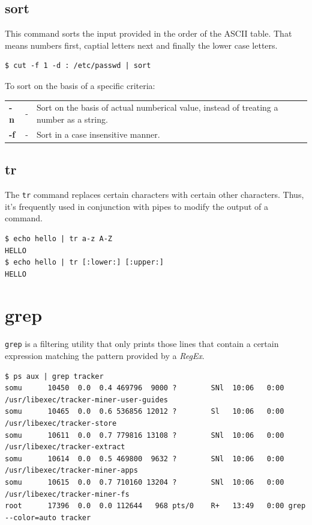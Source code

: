 \subsection{sort}
This command sorts the input provided in the order of the ASCII table. That means numbers first, captial letters next and finally the lower case letters. 

\begin{verbatim}
$ cut -f 1 -d : /etc/passwd | sort
\end{verbatim}

\noindent
To sort on the basis of a specific criteria:

\begin{tabular}{lcp{}}
	\textbf{-n} &- &Sort on the basis of actual numberical value, instead of treating a number as a string. \\
	\textbf{-f} &- &Sort in a case insensitive manner. \\
\end{tabular}

\subsection{tr}
The \verb|tr| command replaces certain characters with certain other characters. Thus, it's frequently used in conjunction with pipes to modify the output of a command. 

\begin{verbatim}
$ echo hello | tr a-z A-Z
HELLO
$ echo hello | tr [:lower:] [:upper:]
HELLO
\end{verbatim}

\section{grep}
\verb|grep| is a filtering utility that only prints those lines that contain a certain expression matching the pattern provided by a \textit{RegEx}.

\begin{verbatim}
$ ps aux | grep tracker
somu      10450  0.0  0.4 469796  9000 ?        SNl  10:06   0:00 /usr/libexec/tracker-miner-user-guides
somu      10465  0.0  0.6 536856 12012 ?        Sl   10:06   0:00 /usr/libexec/tracker-store
somu      10611  0.0  0.7 779816 13108 ?        SNl  10:06   0:00 /usr/libexec/tracker-extract
somu      10614  0.0  0.5 469800  9632 ?        SNl  10:06   0:00 /usr/libexec/tracker-miner-apps
somu      10615  0.0  0.7 710160 13204 ?        SNl  10:06   0:00 /usr/libexec/tracker-miner-fs
root      17396  0.0  0.0 112644   968 pts/0    R+   13:49   0:00 grep --color=auto tracker
\end{verbatim}

